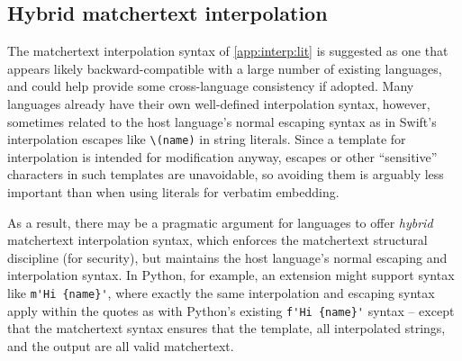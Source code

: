 \subsection{Hybrid matchertext interpolation}
\label{app:interp:hybrid}

The matchertext interpolation syntax of \cref{app:interp:lit}
is suggested as one that appears likely backward-compatible
with a large number of existing languages,
and could help provide some cross-language consistency if adopted.
Many languages already have their own well-defined
interpolation syntax, however,
sometimes related to the host language's normal escaping syntax
as in Swift's interpolation escapes like \verb|\(name)| in string literals.
Since a template for interpolation is intended for modification anyway,
escapes or other ``sensitive'' characters in such templates are unavoidable,
so avoiding them is arguably less important
than when using literals for verbatim embedding.

As a result, there may be a pragmatic argument
for languages to offer \emph{hybrid} matchertext interpolation syntax,
which enforces the matchertext structural discipline (\eg for security),
but maintains the host language's normal escaping and interpolation syntax.
In Python, for example,
an extension might support syntax like \verb|m'Hi {name}'|,
where exactly the same interpolation and escaping syntax
apply within the quotes
as with Python's existing \verb|f'Hi {name}'| syntax --
except that the matchertext syntax ensures that
the template, all interpolated strings,
and the output are all valid matchertext.

